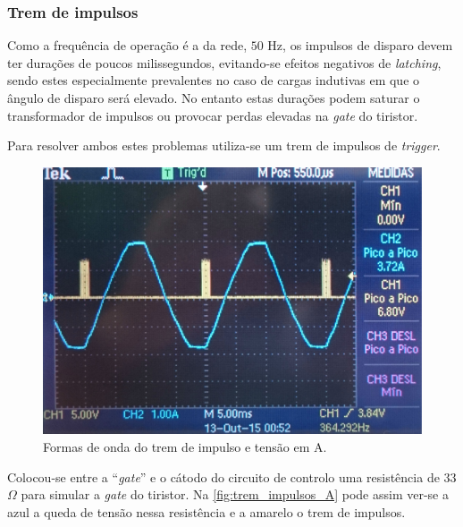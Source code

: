 \documentclass[a4paper,11pt]{article}
\numberwithin{equation}{section}
\begin{document}
\subsubsection{Trem de impulsos}

Como a frequência de operação é a da rede, $50$ Hz, os impulsos de disparo devem ter durações de poucos milissegundos, evitando-se efeitos negativos de \textit{latching}, sendo estes especialmente prevalentes no caso de cargas indutivas em que o ângulo de disparo será elevado. No entanto estas durações podem saturar o transformador de impulsos ou provocar perdas elevadas na \textit{gate} do tiristor.

Para resolver ambos estes problemas utiliza-se um trem de impulsos de \textit{trigger}.

\begin{figure}[H]
	\centering
	\includegraphics[keepaspectratio=true, scale=0.115]{img/figs/trem_impulsos_A}
	\caption{Formas de onda do trem de impulso e tensão em A.}
	\label{fig:trem_impulsos_A}
	\vspace{-0.8em}
\end{figure}

Colocou-se entre a ``\textit{gate}'' e o cátodo do circuito de controlo uma resistência de $33$ $\Omega$ para simular a \textit{gate} do tiristor. Na \autoref{fig:trem_impulsos_A} pode assim ver-se a azul a queda de tensão nessa resistência e a amarelo o trem de impulsos.
\end{document}
